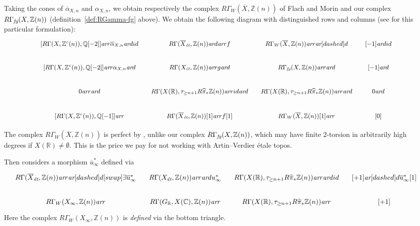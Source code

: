 \documentclass[leqno,12pt]{article}
\theoremstyle{plain}
\theoremstyle{definition}
\newcommand{\CC}{\mathbb{C}}
\newcommand{\QQ}{\mathbb{Q}}
\newcommand{\RR}{\mathbb{R}}
\newcommand{\ZZ}{\mathbb{Z}}
\newcommand{\ar}{\text{\it ar}}
\newcommand{\et}{\text{\it \'{e}t}}
\newcommand{\fg}{\text{\it fg}}
\begin{document}
Taking the cones of $\overline{\alpha}_{X,n}$ and $\alpha_{X,n}$, we obtain
respectively the complex $R\Gamma_W (\overline{X}, \ZZ (n))$ of Flach and Morin
\cite[Definition~3.6]{Flach-Morin-2018} and our complex
$R\Gamma_\fg (X, \ZZ(n))$ (definition~\ref{def:RGamma-fg} above). We obtain the
following diagram with distinguished rows and columns
(see \cite[Proposition~1.4.6]{Neeman-2001} for this particular formulation):
\begin{equation}
  \label{eqn:cones-of-alphas}
  \begin{tikzcd}[column sep=1em,font=\small]
    {[R\Gamma (X, \ZZ^c (n)), \QQ [-2]]} \ar{r}{\overline{\alpha}_{X,n}}\ar{d}{id} & R\Gamma (\overline{X}_\et, \ZZ(n))\ar{d}\ar{r}{f} & R\Gamma_W (\overline{X}, \ZZ(n)) \ar{r}\ar[dashed]{d} & {[-1]}\ar{d}{id} \\
    {[R\Gamma (X, \ZZ^c (n)), \QQ [-2]]} \ar{r}{\alpha_{X,n}}\ar{d} & R\Gamma (X_\et, \ZZ(n)) \ar{r}{g}\ar{d} & R\Gamma_\fg (X, \ZZ(n)) \ar{r}\ar{d} & {[-1]}\ar{d} \\
    0\ar{r}\ar{d} & R\Gamma (X (\RR), \tau_{\ge n+1} R \widehat{\pi}_* \ZZ (n)) \ar{r}{id}\ar{d} & R\Gamma (X (\RR), \tau_{\ge n+1} R \widehat{\pi}_* \ZZ (n)) \ar{r}\ar{d} & 0\ar{d} \\
    {[R\Gamma (X, \ZZ^c (n)), \QQ [-1]]} \ar{r} & R\Gamma (\overline{X}_\et, \ZZ(n))[1]\ar{r}{f[1]} & R\Gamma_W (\overline{X}, \ZZ(n))[1] \ar{r} & {[0]}
  \end{tikzcd}
\end{equation}

The complex $R\Gamma_W (\overline{X}, \ZZ(n))$ is perfect by
\cite[Proposition~3.8]{Flach-Morin-2018}, unlike our complex
$R\Gamma_\fg (X, \ZZ(n))$,
which may have finite $2$-torsion in arbitrarily high degrees if
$X (\RR) \ne \emptyset$. This is the price we pay for not working with
Artin--Verdier \'{e}tale topos.

Then \cite[Definition~3.23]{Flach-Morin-2018} considers a morphism
$\overline{u}^*_\infty$ defined via
\begin{equation}
  \label{eqn:definition-of-u-bar-infty}
  \begin{tikzcd}[column sep=1em]
    R\Gamma (\overline{X}_\et, \ZZ(n)) \ar{r}\ar[dashed]{d}[swap]{\exists}{\overline{u}_\infty^*} & R\Gamma (X_\et, \ZZ(n)) \ar{r}\ar{d}{u_\infty^*} & R\Gamma (X(\RR), \tau_{\ge n+1} R \widehat{\pi}_* \ZZ (n)) \ar{r}\ar{d}{id} & {[+1]} \ar[dashed]{d}{\overline{u}_\infty^* [1]} \\
    R\Gamma_W (X_\infty, \ZZ (n)) \ar{r} & R\Gamma (G_\RR, X (\CC), \ZZ (n)) \ar{r} & R\Gamma (X(\RR), \tau_{\ge n+1} R \widehat{\pi}_* \ZZ (n)) \ar{r} & {[+1]}
  \end{tikzcd}
\end{equation}
Here the complex $R\Gamma_W (X_\infty, \ZZ(n))$ is \emph{defined} via the bottom
triangle.
\end{document}
